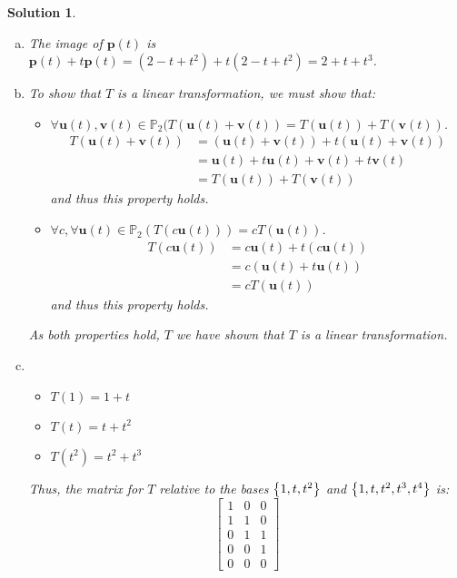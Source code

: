 \documentclass[11pt]{scrartcl}
\theoremstyle{dotlessP}
\newtheorem{sol}{Solution}[section]
\theoremstyle{dotlessN}
\DeclarePairedDelimiter\set{\{}{\}}
\begin{document}
\begin{sol} \
	\begin{enumerate}[a)]
		\item The image of $\bm{p}(t)$ is $\bm{p}(t) + t\bm{p}(t) = (2 - t + t^2) + t(2 - t + t^2) = 2 + t + t^3$.
		\item To show that $T$ is a linear transformation, we must show that:
			\begin{itemize}
				\item $\forall \bm{u}(t), \bm{v}(t) \in \mathbb{P}_2( T(\bm{u}(t) + \bm{v}(t)) = T(\bm{u}(t)) + T(\bm{v}(t))$.
					\begin{align*}
						T(\bm{u}(t) + \bm{v}(t)) &= (\bm{u}(t) + \bm{v}(t)) + t(\bm{u}(t) + \bm{v}(t)) \\
												 &= \bm{u}(t) + t\bm{u}(t) + \bm{v}(t) + t\bm{v}(t) \\
												 &= T(\bm{u}(t)) + T(\bm{v}(t))
					\end{align*}
					and thus this property holds.
				\item $\forall c, \forall\bm{u}(t) \in \mathbb{P}_2(T(c\bm{u}(t))) = cT(\bm{u}(t))$.
					\begin{align*}
						T(c\bm{u}(t)) &= c\bm{u}(t) + t(c\bm{u}(t)) \\
									  &= c(\bm{u}(t) + t\bm{u}(t)) \\
									  &= cT(\bm{u}(t))
					\end{align*}
					and thus this property holds.
			\end{itemize}
			As both properties hold, $T$ we have shown that $T$ is a linear transformation.
		\item
			\begin{itemize}
				\item $T(1) = 1 + t$
				\item $T(t) = t + t^2$
				\item $T(t^2) = t^2 + t^3$
			\end{itemize}
			Thus, the matrix for $T$ relative to the bases $\set*{1,t,t^2}$ and $\set*{1,t,t^2,t^3, t^4}$ is:
			 \[
			\begin{bmatrix}
				1 & 0 & 0 \\
				1 & 1 & 0 \\
				0 & 1 & 1 \\
				0 & 0 & 1 \\
				0 & 0 & 0
			\end{bmatrix}
			\]
	\end{enumerate}
\end{sol}
\end{document}
